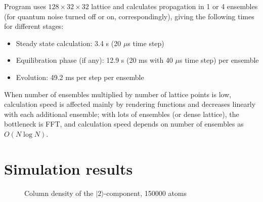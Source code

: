 \documentclass[12pt,notitlepage]{report}
\begin{document}
Program uses $128\times32\times32$ lattice and calculates propagation in 1 or 4 ensembles
(for quantum noise turned off or on, correspondingly), giving the following times for different stages:

\begin{itemize}
\item Steady state calculation: 3.4 s (20 $\mu$s time step)
\item Equilibration phase (if any): 12.9 s (20 ms with 40 $\mu$s time step) per ensemble
\item Evolution: 49.2 ms per step per ensemble
\end{itemize}

When number of ensembles multiplied by number of lattice points is low,
calculation speed is affected mainly by rendering functions and decreases linearly with each additional ensemble;
with lots of ensembles (or dense lattice), the bottleneck is FFT,
and calculation speed depends on number of ensembles as $O(N\log{N})$.

\section*{Simulation results}

\begin{figure}
\begin{center}
\qquad
{}
\end{center}
\caption{Column density of the $\vert2\rangle$-component, 150000 atoms}
\label{evolution_vs_reference}
\end{figure}
\end{document}
